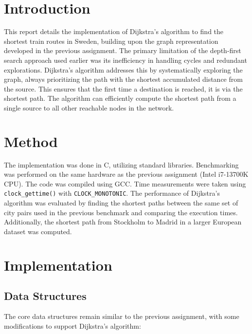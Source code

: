 

\maketitle

\section*{Introduction}
This report details the implementation of Dijkstra's algorithm to find the shortest train routes in Sweden, building upon the graph representation developed in the previous assignment. The primary limitation of the depth-first search approach used earlier was its inefficiency in handling cycles and redundant explorations. Dijkstra's algorithm addresses this by systematically exploring the graph, always prioritizing the path with the shortest accumulated distance from the source. This ensures that the first time a destination is reached, it is via the shortest path. The algorithm can efficiently compute the shortest path from a single source to all other reachable nodes in the network.

\section*{Method}
The implementation was done in C, utilizing standard libraries. Benchmarking was performed on the same hardware as the previous assignment (Intel i7-13700K CPU). The code was compiled using GCC. Time measurements were taken using \texttt{clock\_gettime()} with \texttt{CLOCK\_MONOTONIC}. The performance of Dijkstra's algorithm was evaluated by finding the shortest paths between the same set of city pairs used in the previous benchmark and comparing the execution times. Additionally, the shortest path from Stockholm to Madrid in a larger European dataset was computed.

\section*{Implementation}

\subsection*{Data Structures}
The core data structures remain similar to the previous assignment, with some modifications to support Dijkstra's algorithm:

